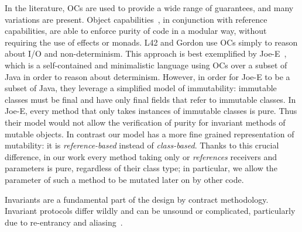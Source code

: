 In the literature, OCs are used to provide a wide range of guarantees, and many variations are present.
Object capabilities~\cite{RobustComposition}, in conjunction with reference capabilities, are able to
 enforce purity of code in a modular way, without requiring the use of effects or monads.
L42 and Gordon use OCs simply to reason about I/O and non-determinism. This approach is best exemplified by Joe-E~\cite{finifter2008verifiable}, which is a self-contained and minimalistic language using OCs over a subset of Java in order to reason about determinism.
However, in order for Joe-E to be a subset of Java, they leverage a simplified model of immutability:
immutable classes must be final and have only final fields that refer to immutable classes.
In Joe-E, every method that only takes instances of immutable classes is pure.
Thus their model would not allow the verification of purity for invariant methods of mutable objects.
In contrast our model has a more fine grained representation of mutability: it is \emph{reference-based} instead of \emph{class-based}.
Thanks to this crucial difference, in our work every method taking only \Q@read@ or \Q@imm@ \emph{references} receivers and parameters is pure, regardless of their class type; in particular, we allow the parameter of such a method to be mutated later on by other code.

Invariants are a fundamental part of the design by contract methodology. 
Invariant protocols differ wildly and can be unsound or complicated, particularly due to re-entrancy and aliasing~\cite{leino2004object,drossopoulou2008unified,meyer2016class}. 

